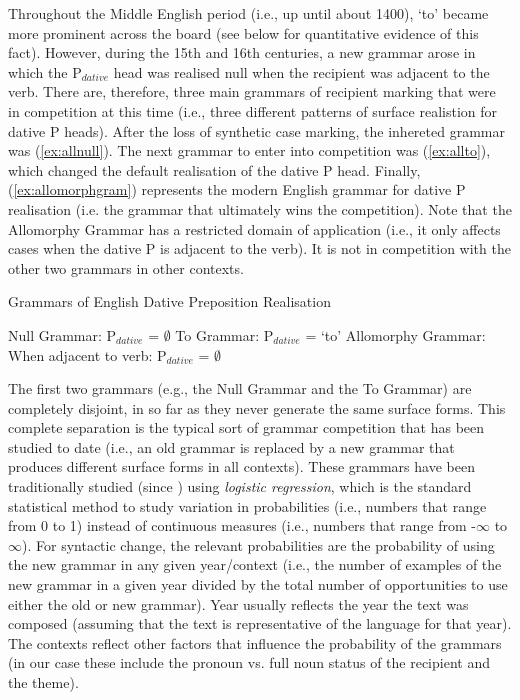 	Throughout the Middle English period (i.e., up until about 1400), `to' became more prominent across the board (see below for quantitative evidence of this fact). However, during the 15th and 16th centuries, a new grammar arose in which the P$_{dative}$ head was realised null when the recipient was adjacent to the verb. There are, therefore, three main grammars of recipient marking that were in competition at this time (i.e., three different patterns of surface realistion for dative P heads). After the loss of synthetic case marking, the inhereted grammar was (\ref{ex:allnull}). The next grammar to enter into competition was (\ref{ex:allto}), which changed the default realisation of the dative P head. Finally, (\ref{ex:allomorphgram}) represents the modern English grammar for dative P realisation (i.e. the grammar that ultimately wins the competition). Note that the Allomorphy Grammar has a restricted domain of application (i.e., it only affects cases when the dative P is adjacent to the verb). It is not in competition with the other two grammars in other contexts.

	\begin{exe}
		\ex Grammars of English Dative Preposition Realisation
		\begin{xlist}
			\ex Null Grammar: P$_{dative}$ = $\emptyset$ \label{ex:allnull}
			\ex To Grammar: P$_{dative}$ = `to' \label{ex:allto}
			\ex Allomorphy Grammar: When adjacent to verb: P$_{dative}$ = $\emptyset$\label{ex:allomorphgram}
		\end{xlist}
	\end{exe}

	The first two grammars (e.g., the Null Grammar and the To Grammar) are completely disjoint, in so far as they never generate the same surface forms. This complete separation is the typical sort of grammar competition that has been studied to date (i.e., an old grammar is replaced by a new grammar that produces different surface forms in all contexts). These grammars have been traditionally studied (since \citealt{Kroch.1989}) using \textit{logistic regression}, which is the standard statistical method to study variation in probabilities (i.e., numbers that range from 0 to 1) instead of continuous measures (i.e., numbers that range from -$\infty$ to $\infty$). For syntactic change, the relevant probabilities are the probability of using the new grammar in any given year/context (i.e., the number of examples of the new grammar in a given year divided by the total number of opportunities to use either the old or new grammar). Year usually reflects the year the text was composed (assuming that the text is representative of the language for that year). The contexts reflect other factors that influence the probability of the grammars (in our case these include the pronoun vs. full noun status of the recipient and the theme).

